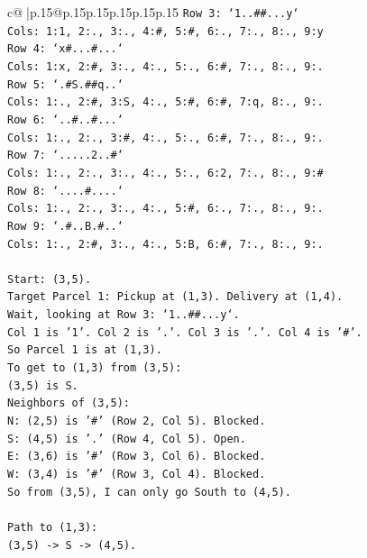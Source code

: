 \documentclass{article}
\begin{document}
{\begin{supertabular}{c@{$\;$}|p{.15\linewidth}@{}p{.15\linewidth}p{.15\linewidth}p{.15\linewidth}p{.15\linewidth}p{.15\linewidth}}
{{{\texttt{Row 3: `1..\#\#...y`} \\
\texttt{Cols: 1:1, 2:., 3:., 4:\#, 5:\#, 6:., 7:., 8:., 9:y} \\
\texttt{Row 4: `x\#...\#...`} \\
\texttt{Cols: 1:x, 2:\#, 3:., 4:., 5:., 6:\#, 7:., 8:., 9:.} \\
\texttt{Row 5: `.\#S.\#\#q..`} \\
\texttt{Cols: 1:., 2:\#, 3:S, 4:., 5:\#, 6:\#, 7:q, 8:., 9:.} \\
\texttt{Row 6: `..\#..\#...`} \\
\texttt{Cols: 1:., 2:., 3:\#, 4:., 5:., 6:\#, 7:., 8:., 9:.} \\
\texttt{Row 7: `.....2..\#`} \\
\texttt{Cols: 1:., 2:., 3:., 4:., 5:., 6:2, 7:., 8:., 9:\#} \\
\texttt{Row 8: `....\#....`} \\
\texttt{Cols: 1:., 2:., 3:., 4:., 5:\#, 6:., 7:., 8:., 9:.} \\
\texttt{Row 9: `.\#..B.\#..`} \\
\texttt{Cols: 1:., 2:\#, 3:., 4:., 5:B, 6:\#, 7:., 8:., 9:.} \\
\\ 
\texttt{Start: (3,5).} \\
\texttt{Target Parcel 1: Pickup at (1,3). Delivery at (1,4).} \\
\texttt{Wait, looking at Row 3: `1..\#\#...y`.} \\
\texttt{Col 1 is '1'. Col 2 is '.'. Col 3 is '.'. Col 4 is '\#'.} \\
\texttt{So Parcel 1 is at (1,3).} \\
\texttt{To get to (1,3) from (3,5):} \\
\texttt{(3,5) is S.} \\
\texttt{Neighbors of (3,5):} \\
\texttt{N: (2,5) is '\#' (Row 2, Col 5). Blocked.} \\
\texttt{S: (4,5) is '.' (Row 4, Col 5). Open.} \\
\texttt{E: (3,6) is '\#' (Row 3, Col 6). Blocked.} \\
\texttt{W: (3,4) is '\#' (Row 3, Col 4). Blocked.} \\
\texttt{So from (3,5), I can only go South to (4,5).} \\
\\ 
\texttt{Path to (1,3):} \\
\texttt{(3,5) {-}> S {-}> (4,5).} \\
}}}
\end{supertabular}}
\end{document}
